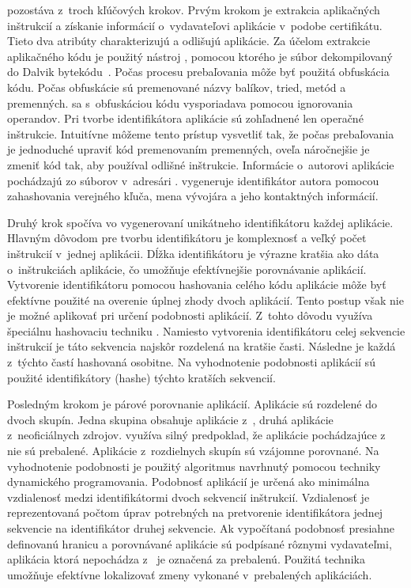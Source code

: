 pozostáva z~troch kľúčových krokov. Prvým krokom je extrakcia aplikačných inštrukcií a získanie informácií o~vydavateľovi aplikácie v~podobe certifikátu. Tieto dva atribúty charakterizujú a odlišujú aplikácie.
Za účelom extrakcie aplikačného kódu je použitý nástroj , pomocou ktorého je súbor  dekompilovaný do Dalvik bytekódu~\cite{smali}.  Počas procesu prebaľovania môže byť použitá obfuskácia kódu. Počas obfuskácie sú premenované názvy balíkov, tried, metód a premenných.  sa s~obfuskáciou kódu vysporiadava pomocou ignorovania operandov. Pri tvorbe identifikátora aplikácie sú zohľadnené len operačné inštrukcie. Intuitívne môžeme tento prístup vysvetliť tak, že počas prebaľovania je jednoduché upraviť kód premenovaním premenných, oveľa náročnejšie je zmeniť kód tak, aby používal odlišné inštrukcie. 
Informácie o~autorovi aplikácie pochádzajú zo súborov v~adresári .  vygeneruje identifikátor autora pomocou zahashovania verejného kľuča, mena vývojára a jeho kontaktných informácií. 

Druhý krok spočíva vo vygenerovaní unikátneho identifikátoru každej aplikácie. Hlavným dôvodom pre tvorbu identifikátoru je komplexnosť a veľký počet inštrukcií v~jednej aplikácii. Dĺžka identifikátoru je výrazne kratšia ako dáta o~inštrukciách aplikácie, čo umožňuje efektívnejšie porovnávanie aplikácií. 
Vytvorenie identifikátoru pomocou hashovania celého kódu aplikácie môže byť efektívne použité na overenie úplnej zhody dvoch aplikácií. Tento postup však nie je možné aplikovať pri určení podobnosti aplikácií.  Z~tohto dôvodu využíva  špeciálnu hashovaciu techniku  \cite{fuzzyHashing}. Namiesto vytvorenia identifikátoru celej sekvencie inštrukcií je táto sekvencia najskôr rozdelená na kratšie časti. Následne je každá z~týchto častí hashovaná osobitne. Na vyhodnotenie podobnosti aplikácií sú použité identifikátory (hashe) týchto kratších sekvencií.

Posledným krokom je párové porovnanie aplikácií. Aplikácie sú  rozdelené do dvoch skupín. Jedna skupina obsahuje aplikácie z~, druhá aplikácie z~neoficiálnych zdrojov.   využíva silný predpoklad, že aplikácie pochádzajúce z~ nie sú prebalené. 
Aplikácie z~rozdielnych skupín sú vzájomne porovnané. Na vyhodnotenie podobnosti je použitý algoritmus navrhnutý pomocou techniky dynamického programovania. Podobnosť aplikácií je určená ako minimálna vzdialenosť medzi identifikátormi dvoch sekvencií inštrukcií.  Vzdialenosť je reprezentovaná počtom úprav potrebných na pretvorenie identifikátora jednej sekvencie na identifikátor druhej sekvencie. Ak vypočítaná podobnosť presiahne definovanú hranicu a porovnávané aplikácie sú podpísané rôznymi vydavateľmi, aplikácia ktorá nepochádza z~ je označená za prebalenú. Použitá technika umožňuje efektívne lokalizovať zmeny vykonané v~prebalených aplikáciách. 

